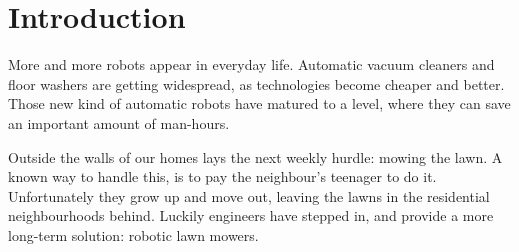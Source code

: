 \chapter{Introduction}
More and more robots appear in everyday life. Automatic vacuum cleaners and floor washers are getting widespread, as technologies become cheaper and better. Those new kind of automatic robots have matured to a level, where they can save an important amount of man-hours.

Outside the walls of our homes lays the next weekly hurdle: mowing the lawn. A known way to handle this, is to pay the neighbour's teenager to do it. Unfortunately they grow up and move out, leaving the lawns in the residential neighbourhoods behind.
Luckily engineers have stepped in, and provide a more long-term solution: robotic lawn mowers.